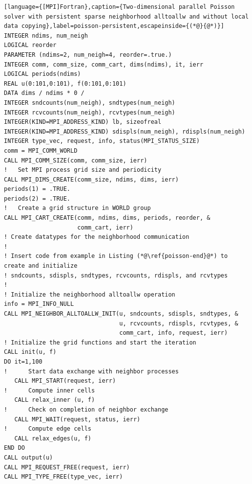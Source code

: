 \begin{example}
\begin{lstlisting}[language={[MPI]Fortran},caption={Two-dimensional parallel Poisson solver with persistent sparse neighborhood alltoallw and without local data copying},label=poisson-persistent,escapeinside={(*@}{@*)}]
INTEGER ndims, num_neigh
LOGICAL reorder
PARAMETER (ndims=2, num_neigh=4, reorder=.true.)
INTEGER comm, comm_size, comm_cart, dims(ndims), it, ierr
LOGICAL periods(ndims)
REAL u(0:101,0:101), f(0:101,0:101)
DATA dims / ndims * 0 /
INTEGER sndcounts(num_neigh), sndtypes(num_neigh)
INTEGER rcvcounts(num_neigh), rcvtypes(num_neigh)
INTEGER(KIND=MPI_ADDRESS_KIND) lb, sizeofreal
INTEGER(KIND=MPI_ADDRESS_KIND) sdispls(num_neigh), rdispls(num_neigh)
INTEGER type_vec, request, info, status(MPI_STATUS_SIZE)
comm = MPI_COMM_WORLD
CALL MPI_COMM_SIZE(comm, comm_size, ierr)
!   Set MPI process grid size and periodicity
CALL MPI_DIMS_CREATE(comm_size, ndims, dims, ierr)
periods(1) = .TRUE.
periods(2) = .TRUE.
!   Create a grid structure in WORLD group
CALL MPI_CART_CREATE(comm, ndims, dims, periods, reorder, &
                     comm_cart, ierr)
! Create datatypes for the neighborhood communication
!
! Insert code from example in Listing (*@\ref{poisson-end}@*) to create and initialize
! sndcounts, sdispls, sndtypes, rcvcounts, rdispls, and rcvtypes
!
! Initialize the neighborhood alltoallw operation
info = MPI_INFO_NULL
CALL MPI_NEIGHBOR_ALLTOALLW_INIT(u, sndcounts, sdispls, sndtypes, &
                                 u, rcvcounts, rdispls, rcvtypes, &
                                 comm_cart, info, request, ierr)
! Initialize the grid functions and start the iteration
CALL init(u, f)
DO it=1,100
!      Start data exchange with neighbor processes
   CALL MPI_START(request, ierr)
!      Compute inner cells
   CALL relax_inner (u, f)
!      Check on completion of neighbor exchange
   CALL MPI_WAIT(request, status, ierr)
!      Compute edge cells
   CALL relax_edges(u, f)
END DO
CALL output(u)
CALL MPI_REQUEST_FREE(request, ierr)
CALL MPI_TYPE_FREE(type_vec, ierr)
\end{lstlisting}
\end{example}


